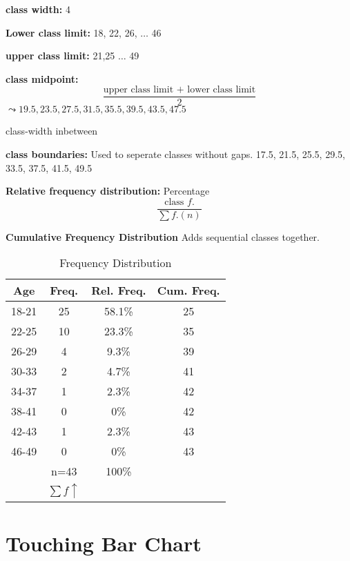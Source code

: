 \begin{multicols}{2}


    \textbf{class width:} 4

    \textbf{Lower class limit:} 18, 22, 26, $\ldots$ 46

    \textbf{upper class limit:} 21,25 $\ldots$ 49

    \textbf{class midpoint:}
    \[ \frac{\text{upper class limit + lower class limit}}{2}\] 
    $\leadsto 19.5, 23.5, 27.5, 31.5, 35.5, 39.5, 43.5, 47.5$

    class-width inbetween

    \textbf{class boundaries:}
    Used to seperate classes without gaps.
    17.5, 21.5, 25.5, 29.5, 33.5, 37.5, 41.5, 49.5

    \textbf{Relative frequency distribution:} Percentage \[\frac{\text{class } f.}{\sum f. (n)}\]

    \textbf{Cumulative Frequency Distribution}
    Adds sequential classes together.
\end{multicols}

\begin{table}[htbp]
    \centering
    \begin{tabular}{c|c|c|c}
        \toprule
        Age & Freq. & Rel. Freq. & Cum. Freq.\\
        \midrule
        18-21 & 25 & 58.1\% & 25  \\
        22-25 & 10 & 23.3\% & 35  \\
        26-29 & 4  & 9.3\%  & 39  \\
        30-33 & 2  & 4.7\%  & 41  \\
        34-37 & 1  & 2.3\%  & 42  \\
        38-41 & 0  & 0\%    & 42  \\
        42-43 & 1  & 2.3\%  & 43  \\
        46-49 & 0  & 0\%    & 43  \\
        \midrule
              & n=43 & 100\% \\
              & $\sum f \uparrow $ \\
              \bottomrule
    \end{tabular}
    \caption{Frequency Distribution}
\end{table}



\section{Touching Bar Chart}

